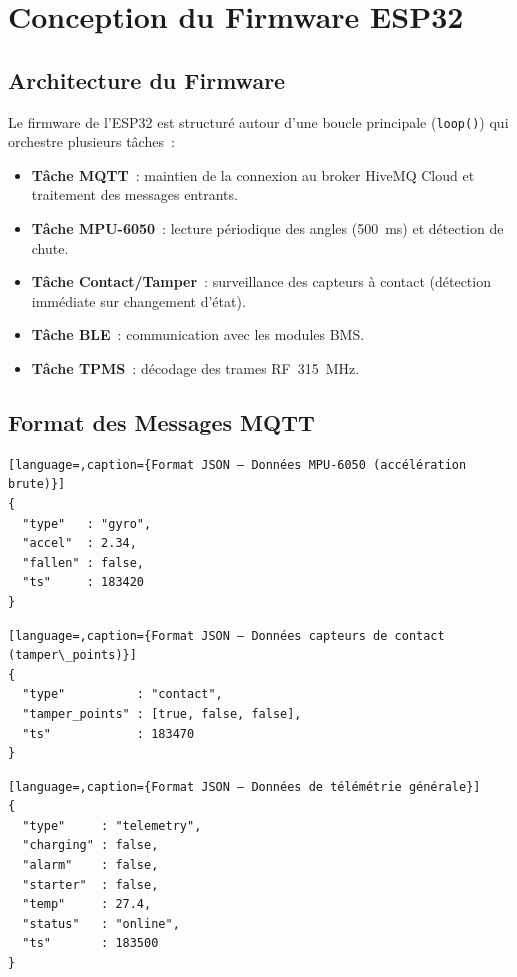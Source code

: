 \documentclass[12pt, a4paper]{report}
\begin{document}
\section{Conception du Firmware ESP32}

\subsection{Architecture du Firmware}

Le firmware de l'ESP32 est structuré autour d'une boucle principale (\texttt{loop()})
qui orchestre plusieurs tâches~:

\begin{itemize}
  \item \textbf{Tâche MQTT}~: maintien de la connexion au broker HiveMQ Cloud et
        traitement des messages entrants.
  \item \textbf{Tâche MPU-6050}~: lecture périodique des angles (500~ms) et
        détection de chute.
  \item \textbf{Tâche Contact/Tamper}~: surveillance des capteurs à contact
        (détection immédiate sur changement d'état).
  \item \textbf{Tâche BLE}~: communication avec les modules BMS.
  \item \textbf{Tâche TPMS}~: décodage des trames RF~315~MHz.
\end{itemize}

\subsection{Format des Messages MQTT}

\begin{lstlisting}[language=,caption={Format JSON — Données MPU-6050 (accélération brute)}]
{
  "type"   : "gyro",
  "accel"  : 2.34,
  "fallen" : false,
  "ts"     : 183420
}
\end{lstlisting}

\begin{lstlisting}[language=,caption={Format JSON — Données capteurs de contact (tamper\_points)}]
{
  "type"          : "contact",
  "tamper_points" : [true, false, false],
  "ts"            : 183470
}
\end{lstlisting}

\begin{lstlisting}[language=,caption={Format JSON — Données de télémétrie générale}]
{
  "type"     : "telemetry",
  "charging" : false,
  "alarm"    : false,
  "starter"  : false,
  "temp"     : 27.4,
  "status"   : "online",
  "ts"       : 183500
}
\end{lstlisting}
\end{document}

